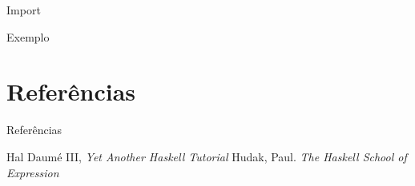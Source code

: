 \documentclass{beamer}
\begin{document}
			\begin{frame}[fragile]{Import}
			 \begin{block}{Exemplo}
			  
			 \end{block}
			\end{frame}
			
\section{Referências}
\begin{frame}{Referências}
	\begin{thebibliography}{9}
	 Hal Daumé III, \textit{Yet Another Haskell Tutorial}
	 Hudak, Paul. \textit{The Haskell School of Expression}
	\end{thebibliography}
\end{frame}
	
	
\end{document}
